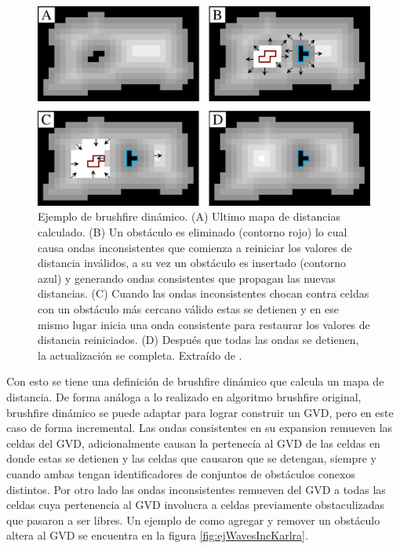 \begin{figure}[H]
  \center
  \includegraphics[width=1\linewidth]{imagenes/wavesBrushDinClean2Rows.png}
  \caption{Ejemplo de brushfire dinámico. (A) Ultimo mapa de distancias calculado. (B) Un obstáculo es eliminado (contorno rojo) lo cual causa ondas inconsistentes que comienza a reiniciar los valores de distancia inválidos, a su vez un obstáculo es insertado (contorno azul) y generando ondas consistentes que propagan las nuevas distancias. (C) Cuando las ondas inconsistentes chocan contra celdas con un obstáculo más cercano válido estas se detienen y en ese mismo lugar inicia una onda consistente para restaurar los valores de distancia reiniciados. (D) Después que todas las ondas se detienen, la actualización se completa. Extraído de \cite{Lau2013}.}\label{fig:wavesBrushDyn}
\end{figure} 

Con esto se tiene una definición de brushfire dinámico que calcula un mapa de distancia. De forma análoga a lo realizado en algoritmo brushfire original, brushfire dinámico se puede adaptar para lograr construir un GVD, pero en este caso de forma incremental. Las ondas consistentes en su expansion remueven las celdas del GVD, adicionalmente causan la pertenecía al GVD de las celdas en donde estas se detienen y las celdas que causaron que se detengan, siempre y cuando ambas tengan identificadores de conjuntos de obstáculos conexos distintos. Por otro lado las ondas inconsistentes remueven del GVD a todas las celdas cuya pertenencia al GVD involucra a celdas previamente obstaculizadas que pasaron a ser libres. Un ejemplo de como agregar y remover un obstáculo altera al GVD se encuentra en la figura \ref{fig:ejWavesIncKarlra}. 

